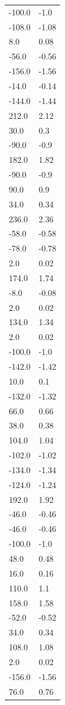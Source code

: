 \begin{longtable}{ll}
-100.0 & -1.0 \\
-108.0 & -1.08 \\
8.0 & 0.08 \\
-56.0 & -0.56 \\
-156.0 & -1.56 \\
-14.0 & -0.14 \\
-144.0 & -1.44 \\
212.0 & 2.12 \\
30.0 & 0.3 \\
-90.0 & -0.9 \\
182.0 & 1.82 \\
-90.0 & -0.9 \\
90.0 & 0.9 \\
34.0 & 0.34 \\
236.0 & 2.36 \\
-58.0 & -0.58 \\
-78.0 & -0.78 \\
2.0 & 0.02 \\
174.0 & 1.74 \\
-8.0 & -0.08 \\
2.0 & 0.02 \\
134.0 & 1.34 \\
2.0 & 0.02 \\
-100.0 & -1.0 \\
-142.0 & -1.42 \\
10.0 & 0.1 \\
-132.0 & -1.32 \\
66.0 & 0.66 \\
38.0 & 0.38 \\
104.0 & 1.04 \\
-102.0 & -1.02 \\
-134.0 & -1.34 \\
-124.0 & -1.24 \\
192.0 & 1.92 \\
-46.0 & -0.46 \\
-46.0 & -0.46 \\
-100.0 & -1.0 \\
48.0 & 0.48 \\
16.0 & 0.16 \\
110.0 & 1.1 \\
158.0 & 1.58 \\
-52.0 & -0.52 \\
34.0 & 0.34 \\
108.0 & 1.08 \\
2.0 & 0.02 \\
-156.0 & -1.56 \\
76.0 & 0.76 \\

\end{longtable}
